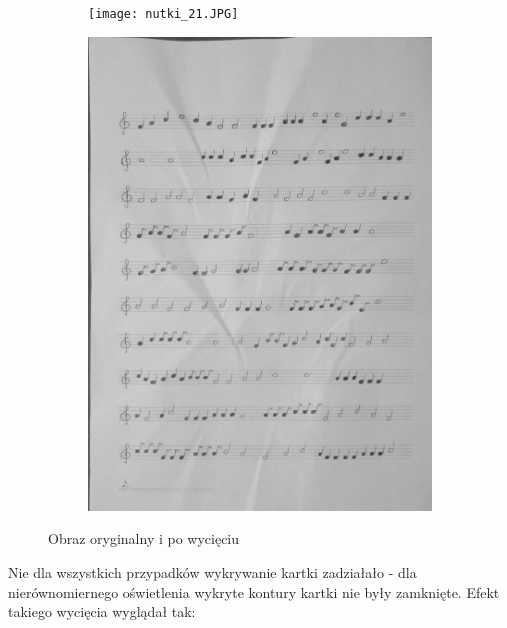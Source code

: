 \documentclass[11pt]{article}
\begin{document}
\begin{figure}
    \centering
    \begin{subfigure}{.5\textwidth}
        \centering
        \graphicspath{ {Resources/} }
        \texttt{[image: nutki\_21.JPG]}
        \label{fig:sub1}
    \end{subfigure}%
    \begin{subfigure}{.5\textwidth}
        \centering
        \graphicspath{ {output/} }
        \includegraphics[width=.9\linewidth]{warped21_gray.jpg}
        \label{fig:sub2}
    \end{subfigure}
    \caption{Obraz oryginalny i po wycięciu}
    \label{fig:test}
\end{figure}


\pagebreak

\begin{flushleft}
Nie dla wszystkich przypadków wykrywanie kartki zadziałało - dla nierównomiernego oświetlenia wykryte kontury kartki nie były zamknięte. 
Efekt takiego wycięcia wyglądał tak:
\end{flushleft}
\end{document}
